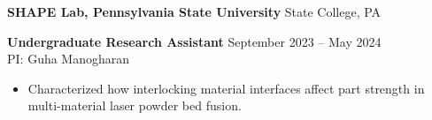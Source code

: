 \vspace{12pt}

\textbf{SHAPE Lab, Pennsylvania State University} \hfill State College, PA

\textbf{Undergraduate Research Assistant} \hfill September 2023 -- May 2024\\
PI: Guha Manogharan
\begin{itemize}[noitemsep, topsep=0pt, partopsep=0pt, parsep=0pt]
    \item Characterized how interlocking material interfaces affect part strength in multi-material laser powder bed fusion.
\end{itemize}
